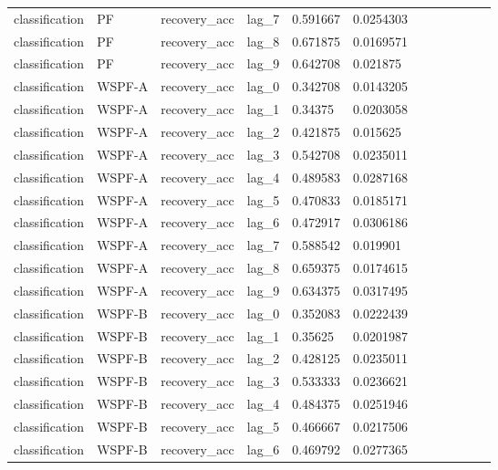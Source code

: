 \begin{tabular}{llllllllllll}
classification & PF & recovery\_acc & lag\_7 & 0.591667 & 0.0254303 &  &  &  &  &  &  \\
classification & PF & recovery\_acc & lag\_8 & 0.671875 & 0.0169571 &  &  &  &  &  &  \\
classification & PF & recovery\_acc & lag\_9 & 0.642708 & 0.021875 &  &  &  &  &  &  \\
classification & WSPF-A & recovery\_acc & lag\_0 & 0.342708 & 0.0143205 &  &  &  &  &  &  \\
classification & WSPF-A & recovery\_acc & lag\_1 & 0.34375 & 0.0203058 &  &  &  &  &  &  \\
classification & WSPF-A & recovery\_acc & lag\_2 & 0.421875 & 0.015625 &  &  &  &  &  &  \\
classification & WSPF-A & recovery\_acc & lag\_3 & 0.542708 & 0.0235011 &  &  &  &  &  &  \\
classification & WSPF-A & recovery\_acc & lag\_4 & 0.489583 & 0.0287168 &  &  &  &  &  &  \\
classification & WSPF-A & recovery\_acc & lag\_5 & 0.470833 & 0.0185171 &  &  &  &  &  &  \\
classification & WSPF-A & recovery\_acc & lag\_6 & 0.472917 & 0.0306186 &  &  &  &  &  &  \\
classification & WSPF-A & recovery\_acc & lag\_7 & 0.588542 & 0.019901 &  &  &  &  &  &  \\
classification & WSPF-A & recovery\_acc & lag\_8 & 0.659375 & 0.0174615 &  &  &  &  &  &  \\
classification & WSPF-A & recovery\_acc & lag\_9 & 0.634375 & 0.0317495 &  &  &  &  &  &  \\
classification & WSPF-B & recovery\_acc & lag\_0 & 0.352083 & 0.0222439 &  &  &  &  &  &  \\
classification & WSPF-B & recovery\_acc & lag\_1 & 0.35625 & 0.0201987 &  &  &  &  &  &  \\
classification & WSPF-B & recovery\_acc & lag\_2 & 0.428125 & 0.0235011 &  &  &  &  &  &  \\
classification & WSPF-B & recovery\_acc & lag\_3 & 0.533333 & 0.0236621 &  &  &  &  &  &  \\
classification & WSPF-B & recovery\_acc & lag\_4 & 0.484375 & 0.0251946 &  &  &  &  &  &  \\
classification & WSPF-B & recovery\_acc & lag\_5 & 0.466667 & 0.0217506 &  &  &  &  &  &  \\
classification & WSPF-B & recovery\_acc & lag\_6 & 0.469792 & 0.0277365 &  &  &  &  &  &  \\

\end{tabular}
